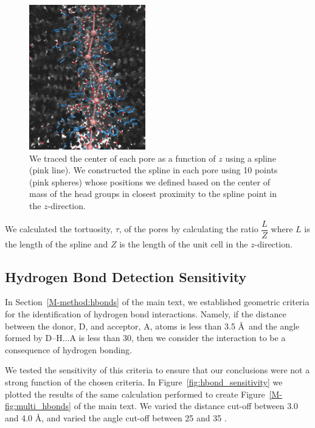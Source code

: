 \documentclass{article}
\begin{document}
  \begin{figure}[!htb]
  \centering
  \includegraphics[width=0.45\textwidth]{spline.pdf}
  \caption{We traced the center of each pore as a function of $z$ using a spline (pink
  line). We constructed the spline in each pore using 10 points (pink spheres) whose
  positions we defined based on the center of mass of the head groups in closest proximity
  to the spline point in the $z$-direction.}\label{fig:spline}
  \end{figure}
  
  We calculated the tortuosity, $\tau$, of the pores by calculating the 
  ratio $\dfrac{L}{Z}$ where $L$ is the length of the spline and $Z$ is 
  the length of the unit cell in the $z$-direction.

  \subsection{Hydrogen Bond Detection Sensitivity}\label{section:hbond_sensitivity}
  
  In Section~\ref{M-method:hbonds} of the main text, we established geometric criteria for the 
  identification of hydrogen bond interactions. Namely, if the distance between the donor,
  D, and acceptor, A, atoms is less than 3.5 \AA~and the angle formed by D--H...A is less
  than 30\degree, then we consider the interaction to be a consequence of hydrogen bonding.
  
  We tested the sensitivity of this criteria to ensure that our conclusions
  were not a strong function of the chosen criteria. In Figure~\ref{fig:hbond_sensitivity} we
  plotted the results of the same calculation performed to create Figure~\ref{M-fig:multi_hbonds}
  of the main text. We varied the distance cut-off between 3.0 and 4.0 \AA, and varied the
  angle cut-off between 25 and 35 \degree. 
  
\end{document}
